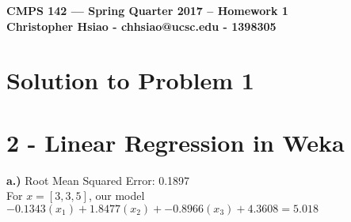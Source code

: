 \documentclass[11pt]{article}
\begin{document}
\begin{center}
{\bf\Large CMPS 142 --- Spring Quarter 2017 --  Homework 1}\\
{\bf Christopher Hsiao - chhsiao@ucsc.edu - 1398305}
\end{center}

\section*{Solution to Problem 1}

\section*{2 - Linear Regression in Weka}

\textbf{a.)} Root Mean Squared Error: 0.1897\\
For $x = [3, 3, 5]$, our model $-0.1343(x_1) + 1.8477(x_2) + -0.8966(x_3) + 4.3608 = 5.018$
\end{document}
